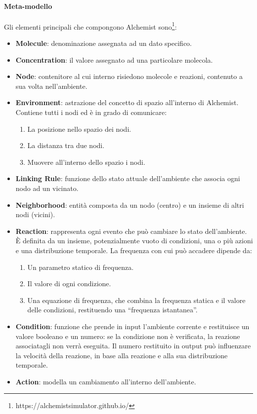 \paragraph{Meta-modello} Gli elementi principali che compongono Alchemist sono\footnote{https://alchemistsimulator.github.io/}:
\begin{itemize}
    \item \textbf{Molecule}: denominazione assegnata ad un dato specifico.
    \item \textbf{Concentration}: il valore assegnato ad una particolare molecola.
    \item \textbf{Node}: contenitore al cui interno risiedono molecole e reazioni, contenuto a sua volta nell'ambiente.
    \item \textbf{Environment}: astrazione del concetto di spazio all'interno di Alchemist. Contiene tutti i nodi ed è in grado di comunicare:
        \begin{enumerate}
            \item La posizione nello spazio dei nodi.
            \item La distanza tra due nodi.
            \item Muovere all'interno dello spazio i nodi.
        \end{enumerate}
    \item \textbf{Linking Rule}: funzione dello stato attuale dell'ambiente che associa ogni nodo ad un vicinato.
    \item \textbf{Neighborhood}: entità composta da un nodo (centro) e un insieme di altri nodi (vicini).
    \item \textbf{Reaction}: rappresenta ogni evento che può cambiare lo stato dell'ambiente. È definita da un insieme, potenzialmente vuoto di condizioni, una o più azioni e una distribuzione temporale.
        La frequenza con cui può accadere dipende da:
        \begin{enumerate}
            \item Un parametro statico di frequenza.
            \item Il valore di ogni condizione.
            \item Una equazione di frequenza, che combina la frequenza statica e il valore delle condizioni, restituendo una ``frequenza istantanea''.
        \end{enumerate}
    \item \textbf{Condition}: funzione che prende in input l'ambiente corrente e restituisce un valore booleano e un numero: se la condizione non è verificata, la reazione associatagli non verrà eseguita.
        Il numero restituito in output può influenzare la velocità della reazione, in base alla reazione e alla sua distribuzione temporale.
    \item \textbf{Action}: modella un cambiamento all'interno dell'ambiente.
\end{itemize}

